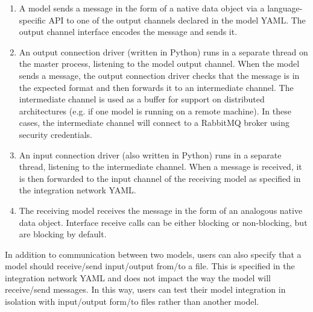 \documentclass[journal]{IEEEtran}
\begin{document}
\begin{enumerate}
	\item A model sends a message in the form of a native data object via a language-specific API to one of the output channels declared in the model YAML. The output channel interface encodes the message and sends it.
	\item An output connection driver (written in Python) runs in a separate thread on the master process, listening to the model output channel. When the model sends a message, the output connection driver checks that the message is in the expected format and then forwards it to an intermediate channel. The intermediate channel is used as a buffer for support on distributed architectures (e.g. if one model is running on a remote machine). In these cases, the intermediate channel will connect to a RabbitMQ broker using security credentials.
	\item An input connection driver (also written in Python) runs in a separate thread, listening to the intermediate channel. When a message is received, it is then forwarded to the input channel of the receiving model as specified in the integration network YAML.
	\item The receiving model receives the message in the form of an analogous native data object. Interface receive calls can be either blocking or non-blocking, but are blocking by default.
\end{enumerate}

In addition to communication between two models, users can also specify that a 
model should receive/send input/output from/to a file. This is specified in 
the integration network YAML and does not impact the way the model will 
receive/send messages. In this way, users can test their model integration in 
isolation with input/output form/to files rather than another model.

\end{document}
